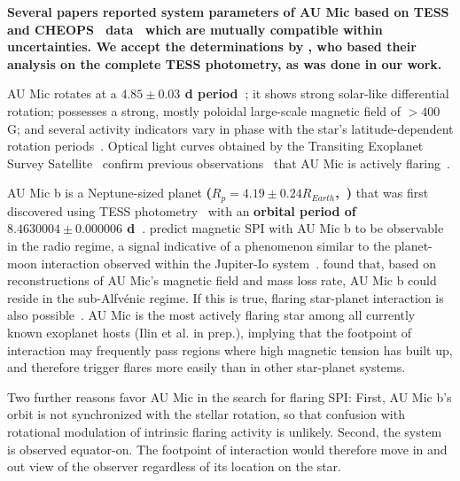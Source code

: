 \documentclass[fleqn,usenatbib]{mnras}%
\begin{document}
\textbf{Several papers reported system parameters of AU Mic based on TESS and CHEOPS~\citep{benz2021cheops} data~\citep{plavchan2020, martioli2021new, szabo2021changing, gilbert2021flares} which are mutually compatible within uncertainties. We accept the determinations by \citet{gilbert2021flares}, who based their analysis on the complete TESS photometry, as was done in our work.}

AU Mic rotates at a \textbf{$4.85\pm0.03$ d period~\citep{gilbert2021flares}}; it shows strong solar-like differential rotation; possesses a strong, mostly poloidal large-scale magnetic field of $>400$ G; and several activity indicators vary in phase with the star's latitude-dependent rotation periods~\citep{klein2021}. Optical light curves obtained by the Transiting Exoplanet Survey Satellite~\citep[TESS,][]{ricker2014} confirm previous observations~\citep{katsova1999, robinson2001, redfield2002} that AU Mic is actively flaring~\citep{martioli2021new}.

AU Mic b is a Neptune-sized planet \textbf{($R_p = 4.19\pm0.24R_{Earth}$,~\citealt{gilbert2021flares})} that was first discovered using TESS photometry~\citep{plavchan2020} with an \textbf{orbital period of $8.4630004\pm0.000006$ d~\citep{gilbert2021flares}}. 
\citet{kavanagh2021} predict magnetic SPI with AU Mic b to be observable in the radio regime, a signal indicative of a phenomenon similar to the planet-moon interaction observed within the Jupiter-Io system~\citep{saur2013magnetic}. \citet{kavanagh2021} found that, based on reconstructions of AU Mic's magnetic field and mass loss rate, AU Mic b could reside in the sub-Alfv\'enic regime. If this is true, flaring star-planet interaction is also possible~\citep{lanza2018close-by}. AU Mic is the most actively flaring star among all currently known exoplanet hosts (Ilin et al. in prep.), implying that the footpoint of interaction may frequently pass regions where high magnetic tension has built up, and therefore trigger flares more easily than in other star-planet systems. 

Two further reasons favor AU Mic in the search for flaring SPI: First, AU Mic b's orbit is not synchronized with the stellar rotation, so that confusion with rotational modulation of intrinsic flaring activity is unlikely. Second, the system is observed equator-on. The footpoint of interaction would therefore move in and out view of the observer regardless of its location on the star.%
\end{document}

